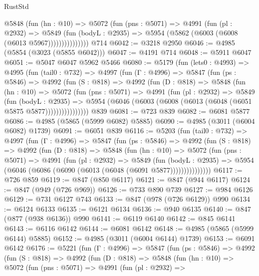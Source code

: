 \begin{lexlean}{RustStd}
\begin{coremodule}
                @5848
                  (fun (hn : @10) =>
                  @5072
                    (fun (pns : @5071) =>
                    @4991
                      (fun (pl : @2932) =>
                      @5849
                        (fun (bodyL : @2935) =>
                        @5954 (@5862 (@6003 (@6008 (@6013 @5967)))))))))))))))
    @714
@6042 := @3218 @2950
@6046 := @4985 (@5854 (@3023 (@5855 @6042)))
@6047 := @4191 @714
@6048 := @5911 @6047
@6051 := @5047 @6047 @5962 @5466
@6080 := @5179
    (fun (lets0 : @4993) =>
    @4995
      (fun (tail0 : @732) =>
      @4997
        (fun (Γ : @4996) =>
        @5847
          (fun (ps : @5846) =>
          @4992
            (fun (S : @818) =>
            @4992
              (fun (D : @818) =>
              @5848
                (fun (hn : @10) =>
                @5072
                  (fun (pns : @5071) =>
                  @4991
                    (fun (pl : @2932) =>
                    @5849
                      (fun (bodyL : @2935) =>
                      @5954 (@6046 (@6003 (@6008 (@6013 (@6048 (@6051 @5875 @5877))))))))))))))))
    @839
@6081 := @723 @839
@6082 := @6081 @5877
@6086 := @4985 (@5865 (@5999 @6082) @5885)
@6090 := @4985 (@3011 (@6004 @6082) @1739)
@6091 := @6051 @839
@6116 := @5203
    (fun (tail0 : @732) =>
    @4997
      (fun (Γ : @4996) =>
      @5847
        (fun (ps : @5846) =>
        @4992
          (fun (S : @818) =>
          @4992
            (fun (D : @818) =>
            @5848
              (fun (hn : @10) =>
              @5072
                (fun (pns : @5071) =>
                @4991
                  (fun (pl : @2932) =>
                  @5849
                    (fun (bodyL : @2935) =>
                    @5954 (@6046 (@6086 (@6090 (@6013 (@6048 (@6091 @5877)))))))))))))))
@6117 := @726 @859
@6119 := @847 (@850 @6117)
@6121 := @847 (@944 @6117)
@6124 := @847 (@949 (@726 @969))
@6126 := @733 @890 @739
@6127 := @984 @6126
@6129 := @731 @6127 @743
@6133 := @847 (@978 (@726 @6129)) @990
@6134 := @6124 @6133
@6135 := @6121 @6134
@6136 := @940 @6135
@6140 := @847 (@877 (@938 @6136)) @990
@6141 := @6119 @6140
@6142 := @845 @6141
@6143 := @6116 @6142
@6144 := @6081 @6142
@6148 := @4985 (@5865 (@5999 @6144) @5885)
@6152 := @4985 (@3011 (@6004 @6144) @1739)
@6153 := @6091 @6142
@6176 := @5221
    (fun (Γ : @4996) =>
    @5847
      (fun (ps : @5846) =>
      @4992
        (fun (S : @818) =>
        @4992
          (fun (D : @818) =>
          @5848
            (fun (hn : @10) =>
            @5072
              (fun (pns : @5071) =>
              @4991
                (fun (pl : @2932) =>

\end{coremodule}
\end{lexlean}
